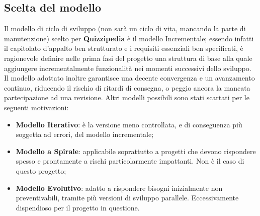 \documentclass[a4paper,11pt]{article}
\begin{document}
	\subsection{Scelta del modello}
	Il modello di ciclo di sviluppo (non sarà un ciclo di vita, mancando la parte di manutenzione) scelto per \textbf{Quizzipedia} è il modello Incrementale; essendo infatti il capitolato d'appalto ben strutturato e i requisiti essenziali ben specificati, è ragionevole definire nelle prima fasi del progetto una struttura di base alla quale aggiungere incrementalmente funzionalità nei momenti successivi dello sviluppo. Il modello adottato inoltre garantisce una decente convergenza e un avanzamento continuo, riducendo il rischio di ritardi di consegna, o peggio ancora la mancata partecipazione ad una revisione.
Altri modelli possibili sono stati scartati per le seguenti motivazioni:
	\begin{itemize}
		\item \textbf{Modello Iterativo}: è la versione meno controllata, e di conseguenza più soggetta ad errori, del modello incrementale;
		\item\textbf{Modello a Spirale}: applicabile soprattutto a progetti che devono rispondere spesso e prontamente a rischi particolarmente impattanti. Non è il caso di questo progetto;
		\item\textbf{Modello Evolutivo}: adatto a rispondere bisogni inizialmente non preventivabili, tramite più versioni di sviluppo parallele. Eccessivamente dispendioso per il progetto in questione.
	\end{itemize}
	
	\newpage
	
\end{document}
